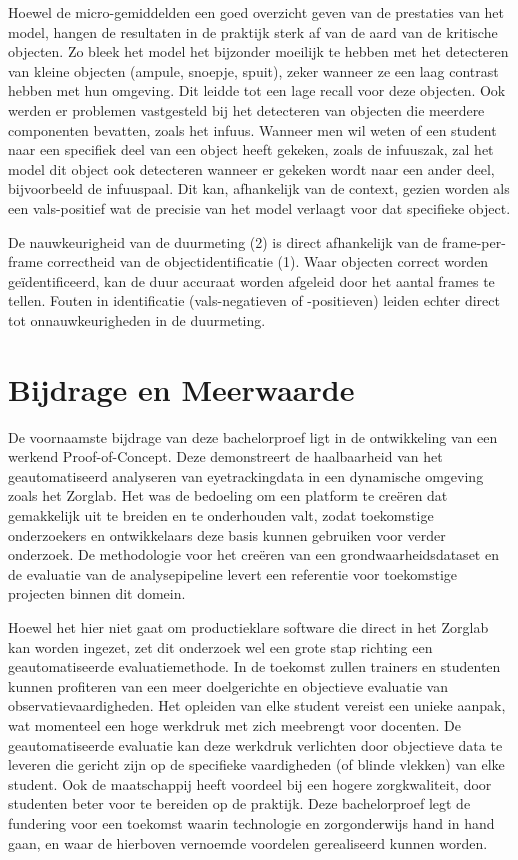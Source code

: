 Hoewel de micro-gemiddelden een goed overzicht geven van de prestaties van het model, hangen de resultaten in de praktijk 
sterk af van de aard van de kritische objecten. 
Zo bleek het model het bijzonder moeilijk te hebben met het detecteren van kleine objecten (ampule, snoepje, spuit), zeker wanneer ze een laag contrast hebben met hun omgeving.
Dit leidde tot een lage recall voor deze objecten.
Ook werden er problemen vastgesteld bij het detecteren van objecten die meerdere componenten bevatten, zoals het infuus.
Wanneer men wil weten of een student naar een specifiek deel van een object heeft gekeken, zoals de infuuszak, 
zal het model dit object ook detecteren wanneer er gekeken wordt naar een ander deel, bijvoorbeeld de infuuspaal.
Dit kan, afhankelijk van de context, gezien worden als een vals-positief wat de precisie van het model verlaagt voor dat specifieke object.

De nauwkeurigheid van de duurmeting (2) is direct afhankelijk van de frame-per-frame correctheid van de objectidentificatie (1).
Waar objecten correct worden geïdentificeerd, kan de duur accuraat worden afgeleid door het aantal frames te tellen. 
Fouten in identificatie (vals-negatieven of -positieven) leiden echter direct tot onnauwkeurigheden in de duurmeting.

\section{Bijdrage en Meerwaarde}

De voornaamste bijdrage van deze bachelorproef ligt in de ontwikkeling van een werkend Proof-of-Concept.
Deze demonstreert de haalbaarheid van het geautomatiseerd analyseren van eyetrackingdata in een dynamische omgeving zoals het Zorglab.
Het was de bedoeling om een platform te creëren dat gemakkelijk uit te breiden en te onderhouden valt, zodat toekomstige onderzoekers 
en ontwikkelaars deze basis kunnen gebruiken voor verder onderzoek.
De methodologie voor het creëren van een grondwaarheidsdataset en de evaluatie van de analysepipeline 
levert een referentie voor toekomstige projecten binnen dit domein.

Hoewel het hier niet gaat om productieklare software die direct in het Zorglab kan worden ingezet, 
zet dit onderzoek wel een grote stap richting een geautomatiseerde evaluatiemethode.
In de toekomst zullen trainers en studenten kunnen profiteren van een meer doelgerichte en objectieve evaluatie van observatievaardigheden.
Het opleiden van elke student vereist een unieke aanpak, wat momenteel een hoge werkdruk met zich meebrengt voor docenten.
De geautomatiseerde evaluatie kan deze werkdruk verlichten door objectieve data te 
leveren die gericht zijn op de specifieke vaardigheden (of blinde vlekken) van elke student. 
Ook de maatschappij heeft voordeel bij een hogere zorgkwaliteit, door studenten beter voor te bereiden op de praktijk.
Deze bachelorproef legt de fundering voor een toekomst waarin technologie en zorgonderwijs hand in hand gaan,
en waar de hierboven vernoemde voordelen gerealiseerd kunnen worden.

